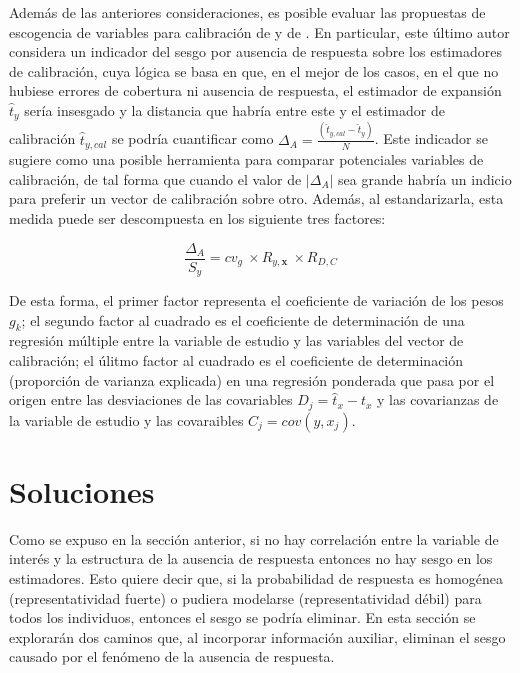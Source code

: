 \documentclass[
  10pt,
  spanish,
]{book}
\begin{document}
Además de las anteriores consideraciones, es posible evaluar las propuestas de escogencia de variables para calibración de \citet{KaltonFloresCervantes_2003} y de \citet{Sarndal_2011}. En particular, este último autor considera un indicador del sesgo por ausencia de respuesta sobre los estimadores de calibración, cuya lógica se basa en que, en el mejor de los casos, en el que no hubiese errores de cobertura ni ausencia de respuesta, el estimador de expansión \(\hat{t}_{y}\) sería insesgado y la distancia que habría entre este y el estimador de calibración \(\hat{t}_{y,cal}\) se podría cuantificar como \(\Delta_A = \frac{(\hat{t}_{y,cal} - \hat{t}_{y})}{N}\). Este indicador se sugiere como una posible herramienta para comparar potenciales variables de calibración, de tal forma que cuando el valor de \(|\Delta_A|\) sea grande habría un indicio para preferir un vector de calibración sobre otro. Además, al estandarizarla, esta medida puede ser descompuesta en los siguiente tres factores:

\[\frac{\Delta_A}{S_y} = cv_g \ \times R_{y,\mathbf{x}} \ \times R_{D,C}\]

De esta forma, el primer factor representa el coeficiente de variación de los pesos \(g_k\); el segundo factor al cuadrado es el coeficiente de determinación de una regresión múltiple entre la variable de estudio y las variables del vector de calibración; el úlitmo factor al cuadrado es el coeficiente de determinación (proporción de varianza explicada) en una regresión ponderada que pasa por el origen entre las desviaciones de las covariables \(D_j = \hat{t}_{x} - t_x\) y las covarianzas de la variable de estudio y las covaraibles \(C_j = cov(y, x_j)\).

\hypertarget{soluciones}{%
\section{Soluciones}\label{soluciones}}

Como se expuso en la sección anterior, si no hay correlación entre la variable de interés y la estructura de la ausencia de respuesta entonces no hay sesgo en los estimadores. Esto quiere decir que, si la probabilidad de respuesta es homogénea (representatividad fuerte) o pudiera modelarse (representatividad débil) para todos los individuos, entonces el sesgo se podría eliminar. En esta sección se explorarán dos caminos que, al incorporar información auxiliar, eliminan el sesgo causado por el fenómeno de la ausencia de respuesta.
\end{document}
